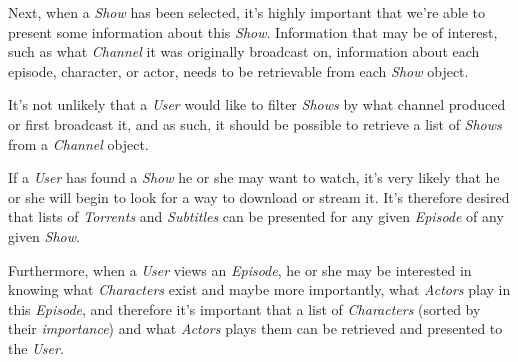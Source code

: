 Next, when a \textit{Show} has been selected, it's highly important that we're able to present some information about this \textit{Show}. Information that may be of interest, such as what \textit{Channel} it was originally broadcast on, information about each episode, character, or actor, needs to be retrievable from each \textit{Show} object. 

It's not unlikely that a \textit{User} would like to filter \textit{Shows} by what channel produced or first broadcast it, and as such, it should be possible to retrieve a list of \textit{Shows} from a \textit{Channel} object.

If a \textit{User} has found a \textit{Show} he or she may want to watch, it's very likely that he or she will begin to look for a way to download or stream it. It's therefore desired that lists of \textit{Torrents} and \textit{Subtitles} can be presented for any given \textit{Episode} of any given \textit{Show}.

Furthermore, when a \textit{User} views an \textit{Episode}, he or she may be interested in knowing what \textit{Characters} exist and maybe more importantly, what \textit{Actors} play in this \textit{Episode}, and therefore it's important that a list of \textit{Characters} (sorted by their \textit{importance}) and what \textit{Actors} plays them can be retrieved and presented to the \textit{User}.
\newpage